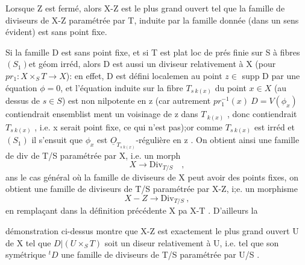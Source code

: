
 Lorsque Z est fermé, alors X-Z est le plus grand ouvert
tel que la famille de diviseurs de X-Z paramétrée par T, induite par la
famille donnée (dans un sens évident) est sans point fixe.

Si la famille D est sans point fixe, et si T est plat loc de prés finie
sur S à fibres $(S_1)$et géom irréd, alors D est aussi un diviseur 
relativement à X (pour $pr_1 : X\times_S T \longrightarrow X$): en effet, D est défini localemen
au point $z \in$ supp D par une équation  $\phi = 0$, et l'équation induite sur la fibre
$T_{s\ k(x)}$ du point $x\in X$ (au dessus de $s\in S$) est non 
nilpotente en z (car autrement $pr_1^{-1}(x)\ D = V(\phi_x)$  contiendrait ensemblist
ment un voisinage de z dans $T_{\ k(x)}$ , donc contiendrait $T_{s\ k(x)}$ , i.e.
x serait point fixe, ce qui n'est pas);or comme $T_{s\ k(x)}$ est irréd et $(S_1)$
il s'ensuit que $\phi_x$ est $\underline{O}_{T_{s\ k(x)}}$-régulière en z . On obtient ainsi
 une famille de div de T/S paramétrée par X, i.e. un morph
\[ X \longrightarrow \mathrm{Div}_{T/S} \quad , \]
ans le cas général où la famille de diviseurs de X peut avoir des points
fixes, on obtient une famille de diviseurs de T/S paramétrée par X-Z,
i;e. un morphisme
\[ X - Z \longrightarrow \mathrm{Div}_{T/S} \ , \]
en remplaçant dans la définition précédente X pa X-T . D'ailleurs la




 

 démonstration ci-dessus montre que X-Z est exactement
le plus grand ouvert U de X tel que $D|(U\times_S T)$ soit un diseur 
relativement à U, i.e. tel que son symétrique ${}^{t}D$  une famille de diviseurs de T/S paramétrée
par U/S .

